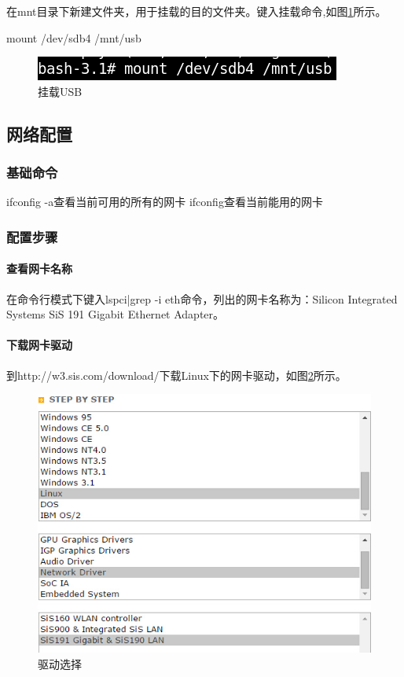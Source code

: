 \documentclass{book}
\begin{document}
在mnt目录下新建文件夹，用于挂载的目的文件夹。键入挂载命令,如图\ref{mountusbdisk}所示。

mount /dev/sdb4 /mnt/usb

\begin{figure}[htbp]
	\centering
	\includegraphics[scale=0.7]{mountusbdisk.png}
	\caption{挂载USB}
	\label{mountusbdisk}
\end{figure}

\subsection{网络配置}

\subsubsection{基础命令}

\noindent ifconfig -a查看当前可用的所有的网卡\newline
ifconfig查看当前能用的网卡


\subsubsection{配置步骤}

\paragraph{查看网卡名称}
在命令行模式下键入lspci|grep -i eth命令，列出的网卡名称为：Silicon Integrated Systems SiS 191 Gigabit Ethernet Adapter。

\paragraph{下载网卡驱动}
到http://w3.sis.com/download/下载Linux下的网卡驱动，如图\ref{DownloadSisDriver}所示。
\begin{figure}[htbp]
	\centering
	\includegraphics[scale=0.7]{DownloadSisDriver.jpg}
	\caption{驱动选择}
	\label{DownloadSisDriver}
\end{figure}
\end{document}
